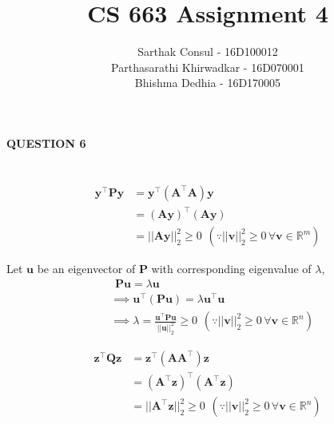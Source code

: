 \documentclass{article}
\title{CS 663 Assignment 4}
\author{Sarthak Consul - 16D100012\\
Parthasarathi Khirwadkar - 16D070001\\
Bhishma Dedhia - 16D170005}
\date{}
\begin{document}
\maketitle

\centerline{\textbf{\large\large{{{QUESTION 6}}}}}


\section{}

\begin{align*}
    \bm{\bm{y}}^\intercal\bm{P}\bm{y} &= \bm{y}^\intercal (\bm{A}^\intercal\bm{A})\bm{y} \\
    &= (\bm{A}\bm{y})^\intercal(\bm{A}\bm{y})\\
    &= \lvert\lvert \bm{A}\bm{y} \rvert\rvert_2^2 \geq 0 \hspace{5pt}(\because \lvert\lvert\bm{v} \rvert\rvert_2^2 \geq 0 \hspace{2pt}\forall \bm{v} \in \mathbb{R}^m)
\end{align*}

Let $\bm{u}$ be an eigenvector of $\bm{P}$ with corresponding eigenvalue of $\lambda$,
\begin{align*}
    &\hspace{5pt}\bm{P}\bm{u} = \lambda \bm{u}\\
    &\implies \bm{u}^\intercal(\bm{P}\bm{u}) = \lambda \bm{u}^\intercal\bm{u}\\
    &\implies \lambda =\frac{\bm{u}^\intercal\bm{P}\bm{u}}{\lvert\lvert\bm{u} \rvert\rvert_2^2} \geq 0 \hspace{5pt}(\because \lvert\lvert\bm{v} \rvert\rvert_2^2 \geq 0 \hspace{2pt}\forall \bm{v} \in \mathbb{R}^n)
\end{align*}

\begin{align*}
    \bm{z}^\intercal\bm{Q}\bm{z} &= \bm{z}^\intercal (\bm{A}\bm{A}^\intercal)\bm{z} \\
    &= (\bm{A}^\intercal\bm{z})^\intercal(\bm{A}^\intercal\bm{z})\\
    &= \lvert\lvert \bm{A}^\intercal\bm{z} \rvert\rvert_2^2 \geq 0\hspace{5pt}(\because \lvert\lvert\bm{v} \rvert\rvert_2^2 \geq 0 \hspace{2pt}\forall \bm{v} \in \mathbb{R}^n)
\end{align*}
\end{document}
